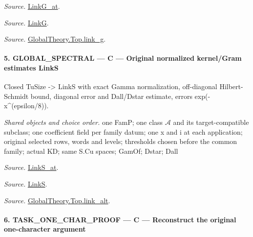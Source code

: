 \documentclass[11pt,a4paper]{article}
\numberwithin{equation}{section}
\theoremstyle{remark}\newtheorem{remark}[theorem]{Remark}
\begin{document}
\emph{Source.} \href{https://github.com/CocoSgt/riemann-hypothesis-lean/blob/7cbf7a0c32fca1badf05931879a37c3f8a2b03b4/src/Formalism/SharpRestriction/GlobalTheoremInputs.lean#L122-L137}{LinkG\_\allowbreak at}.

\emph{Source.} \href{https://github.com/CocoSgt/riemann-hypothesis-lean/blob/7cbf7a0c32fca1badf05931879a37c3f8a2b03b4/src/Formalism/SharpRestriction/GlobalTheoremInputs.lean#L138-L141}{LinkG}.

\emph{Source.} \href{https://github.com/CocoSgt/riemann-hypothesis-lean/blob/7cbf7a0c32fca1badf05931879a37c3f8a2b03b4/src/Development/AbelianVarietyTheory/Proofs/GlobalInterpolation/LinkG.lean#L14-L27}{GlobalTheory.Top.link\_\allowbreak g}.



\paragraph{5. GLOBAL\_\allowbreak SPECTRAL — C — Original normalized kernel/Gram estimates LinkS}

Closed TuSize -> LinkS with exact Gamma normalization, off-diagonal Hilbert-Schmidt bound, diagonal error and Dall/Dstar estimate, errors exp(-x\textasciicircum{}(epsilon/8)).

\emph{Shared objects and choice order.} one FamP; one class $\mathcal A$ and its target-compatible subclass; one coefficient field per family datum; one x and i at each application; original selected rows, words and levels; thresholds chosen before the common family; actual KD; same S.Cu spaces; GamOf; Dstar; Dall

\emph{Source.} \href{https://github.com/CocoSgt/riemann-hypothesis-lean/blob/7cbf7a0c32fca1badf05931879a37c3f8a2b03b4/src/Formalism/SharpRestriction/GlobalTheoremInputs.lean#L145-L149}{LinkS\_\allowbreak at}.

\emph{Source.} \href{https://github.com/CocoSgt/riemann-hypothesis-lean/blob/7cbf7a0c32fca1badf05931879a37c3f8a2b03b4/src/Formalism/SharpRestriction/GlobalTheoremInputs.lean#L152-L157}{LinkS}.

\emph{Source.} \href{https://github.com/CocoSgt/riemann-hypothesis-lean/blob/7cbf7a0c32fca1badf05931879a37c3f8a2b03b4/src/Development/AbelianVarietyTheory/Proofs/GlobalInterpolation/LinkAlt.lean#L16-L50}{GlobalTheory.Top.link\_\allowbreak alt}.



\paragraph{6. TASK\_\allowbreak ONE\_\allowbreak CHAR\_\allowbreak PROOF — C — Reconstruct the original one-character argument}
\end{document}
